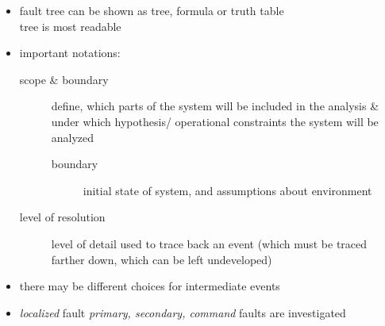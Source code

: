 \documentclass[a4paper, 10pt]{article}
\begin{document}
\begin{itemize}
\begin{multicols}{2}
    \end{multicols}
    \item fault tree can be shown as tree, formula or truth table\\ tree is most readable
    \item important notations:
    \begin{description}
        \item[scope \& boundary] define, which parts of the system will be included in the analysis \& under which hypothesis/ operational constraints the system will be analyzed
        \begin{description}
            \item[boundary] initial state of system, and assumptions about environment
        \end{description}
        \item[level of resolution] level of detail used to trace back an event (which must be traced farther down, which can be left undeveloped)
    \end{description}
    \item there may be different choices for intermediate events
    \item \emph{localized} fault \follows \emph{primary, secondary, command} faults are investigated

\end{itemize}
\end{document}

